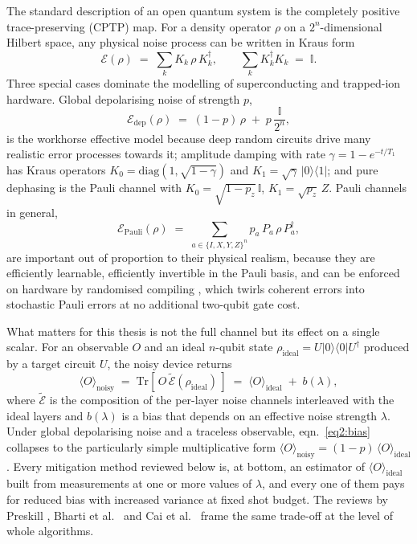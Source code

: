 \documentclass[Thesis.tex]{subfiles}
\begin{document}
The standard description of an open quantum system is the completely positive
trace-preserving (CPTP) map. For a density operator $\rho$ on a
$2^{n}$-dimensional Hilbert space, any physical noise process can be written
in Kraus form \cite{nielsen2012book}
\begin{equation}
  \mathcal{E}(\rho) \;=\; \sum_{k} K_{k}\,\rho\,K_{k}^{\dagger},
  \qquad \sum_{k} K_{k}^{\dagger}K_{k} \;=\; \mathbb{I}.
  \label{eq2:kraus}
\end{equation}
Three special cases dominate the modelling of superconducting and trapped-ion
hardware. Global depolarising noise of strength $p$,
\begin{equation}
  \mathcal{E}_{\mathrm{dep}}(\rho) \;=\; (1-p)\,\rho \;+\; p\,\frac{\mathbb{I}}{2^{n}},
  \label{eq2:depol}
\end{equation}
is the workhorse effective model because deep random circuits drive many
realistic error processes towards it; amplitude damping with rate
$\gamma = 1 - e^{-t/T_{1}}$ has Kraus operators
$K_{0} = \mathrm{diag}(1,\sqrt{1-\gamma})$ and
$K_{1} = \sqrt{\gamma}\,\lvert 0\rangle\langle 1\rvert$; and pure dephasing is
the Pauli channel with $K_{0}=\sqrt{1-p_{z}}\,\mathbb{I}$,
$K_{1}=\sqrt{p_{z}}\,Z$. Pauli channels in general,
\begin{equation}
  \mathcal{E}_{\mathrm{Pauli}}(\rho) \;=\; \sum_{a \in \{I,X,Y,Z\}^{n}} p_{a}\, P_{a}\,\rho\,P_{a}^{\dagger},
  \label{eq2:pauli}
\end{equation}
are important out of proportion to their physical realism, because they are
efficiently learnable, efficiently invertible in the Pauli basis, and can be
enforced on hardware by randomised compiling \cite{wallman2016noise}, which
twirls coherent errors into stochastic Pauli errors at no additional two-qubit
gate cost.

What matters for this thesis is not the full channel but its effect on a single
scalar. For an observable $O$ and an ideal $n$-qubit state
$\rho_{\mathrm{ideal}} = U\lvert 0\rangle\langle 0\rvert U^{\dagger}$ produced
by a target circuit $U$, the noisy device returns
\begin{equation}
  \langle O\rangle_{\mathrm{noisy}} \;=\; \mathrm{Tr}\!\left[\,O\,\widetilde{\mathcal{E}}(\rho_{\mathrm{ideal}})\,\right]
  \;=\; \langle O\rangle_{\mathrm{ideal}} \;+\; b(\lambda),
  \label{eq2:bias}
\end{equation}
where $\widetilde{\mathcal{E}}$ is the composition of the per-layer noise
channels interleaved with the ideal layers and $b(\lambda)$ is a bias that
depends on an effective noise strength $\lambda$. Under global depolarising
noise and a traceless observable, eqn.~\eqref{eq2:bias} collapses to the
particularly simple multiplicative form
$\langle O\rangle_{\mathrm{noisy}} = (1-p)\,\langle O\rangle_{\mathrm{ideal}}$.
Every mitigation method reviewed below is, at bottom, an estimator of
$\langle O\rangle_{\mathrm{ideal}}$ built from measurements at one or more
values of $\lambda$, and every one of them pays for reduced bias with increased
variance at fixed shot budget. The reviews by Preskill
\cite{preskill2018nisq}, Bharti et al.\ \cite{bharti2022noisy} and Cai et al.\
\cite{cai2023review} frame the same trade-off at the level of whole
algorithms.
\end{document}
